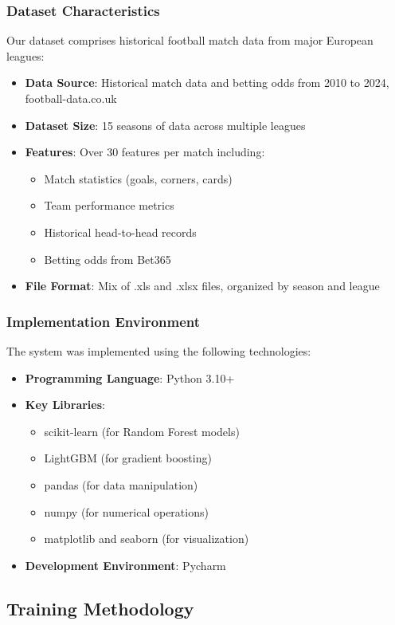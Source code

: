 \documentclass[conference]{IEEEtran}
\begin{document}
\subsubsection{Dataset Characteristics}
Our dataset comprises historical football match data from major European leagues:
\begin{itemize}
\item \textbf{Data Source}: Historical match data and betting odds from 2010 to 2024, football-data.co.uk
\item \textbf{Dataset Size}: 15 seasons of data across multiple leagues
\item \textbf{Features}: Over 30 features per match including:
    \begin{itemize}
    \item Match statistics (goals, corners, cards)
    \item Team performance metrics
    \item Historical head-to-head records
    \item Betting odds from Bet365
    \end{itemize}
\item \textbf{File Format}: Mix of .xls and .xlsx files, organized by season and league
\end{itemize}

\subsubsection{Implementation Environment}
The system was implemented using the following technologies:
\begin{itemize}
\item \textbf{Programming Language}: Python 3.10+
\item \textbf{Key Libraries}:
    \begin{itemize}
    \item scikit-learn (for Random Forest models)
    \item LightGBM (for gradient boosting)
    \item pandas (for data manipulation)
    \item numpy (for numerical operations)
    \item matplotlib and seaborn (for visualization)
    \end{itemize}
\item \textbf{Development Environment}: Pycharm
\end{itemize}

\subsection{Training Methodology}
\end{document}
